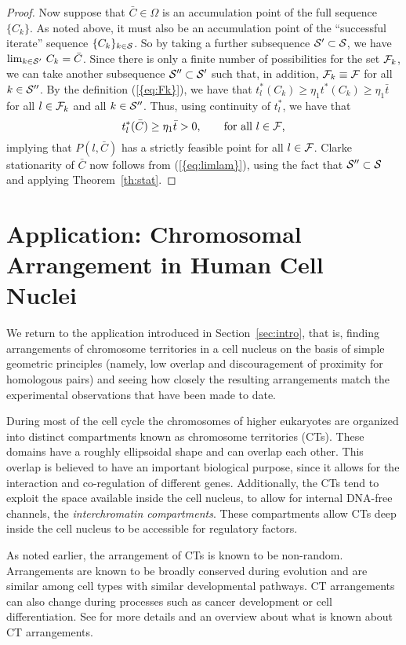 \documentclass{siamltex}
\begin{document}
\begin{proof}
Now suppose that $\bar{C} \in \Omega$ is an accumulation point of the
full sequence $\{ C_k \}$. As noted above, it must also be an
accumulation point of the ``successful iterate'' sequence $\{C_k \}_{k
  \in {{\cal S}}}$. So by taking a further subsequence ${{\cal S}}' \subset {{\cal S}}$, we
have $\lim_{k \in {{\cal S}}'} \, C_k = \bar{C}$. Since there is only a finite
number of possibilities for the set ${{\cal F}}_k$, we can take another
subsequence ${{\cal S}}'' \subset {{\cal S}}'$ such that, in addition, ${{\cal F}}_k \equiv
{{\cal F}}$ for all $k \in {{\cal S}}''$. By the definition {(\ref{{eq:Fk}})}, we have
that $t^*_l(C_k) \ge \eta_1 t^*(C_k) \ge \eta_1 \bar{t}$ for all $l \in
{{\cal F}}_k$ and all $k \in {{\cal S}}''$. Thus, using continuity of $t^*_l$, we have that 
\[
t^*_l(\bar{C}) \ge \eta_1 \bar{t}>0, \qquad \mbox{for all $l \in {{\cal F}}$,}
\]
implying that $P(l,\bar{C})$ has a strictly feasible point for
all $l \in {{\cal F}}$. Clarke stationarity of $\bar{C}$ now follows from
{(\ref{{eq:limlam}})}, using the fact that ${{\cal S}}'' \subset {{\cal S}}$ and
applying Theorem~\ref{th:stat}.
\end{proof}

\section{Application: Chromosomal Arrangement in Human Cell
  Nuclei}\label{sec:biology}

We return to the application introduced in Section~\ref{sec:intro},
that is, finding arrangements of chromosome territories in a cell
nucleus on the basis of simple geometric principles (namely, low
overlap and discouragement of proximity for homologous pairs) and
seeing how closely the resulting arrangements match the experimental
observations that have been made to date.

During most of the cell cycle the chromosomes of higher eukaryotes are
organized into distinct compartments known as chromosome territories
(CTs). These domains have a roughly ellipsoidal shape and can overlap
each other. This overlap is believed to have an important biological
purpose, since it allows for the interaction and co-regulation of
different genes. Additionally, the CTs tend to exploit the space
available inside the cell nucleus, to allow for internal DNA-free
channels, the \emph{interchromatin compartments}. These compartments
allow CTs deep inside the cell nucleus to be accessible for regulatory
factors.

As noted earlier, the arrangement of CTs is known to be
non-random. Arrangements are known to be broadly conserved during
evolution and are similar among cell types with similar developmental
pathways. CT arrangements can also change during processes such as cancer
development or cell differentiation. See \cite{Cremer} for more
details and an overview about what is known about CT arrangements.
\end{document}

